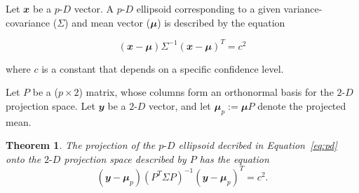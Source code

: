 \documentclass[
  12pt,
]{interact}
\newcommand\pD{$p\text{-}D$}
\newcommand\gD{$2\text{-}D$}
\newtheorem*{theorem}{Theorem}
\begin{document}
Let \(\mathbfit{x}\) be a \pD{} vector. A \pD{} ellipsoid corresponding
to a given variance-covariance (\(\Sigma\)) and mean vector
(\(\mathbfit{\mu}\)) is described by the equation

\begin{equation}
(\mathbfit{x}-\mathbfit{\mu}) \Sigma^{-1}(\mathbfit{x}-\mathbfit{\mu})^T = c^2
\label{eq:pd}
\end{equation}

where \(c\) is a constant that depends on a specific confidence level.

Let \(P\) be a (\(p\times 2\)) matrix, whose columns form an orthonormal
basis for the \gD{} projection space. Let \(\mathbfit{y}\) be a \gD{}
vector, and let \(\mathbfit{\mu}_p := \mathbfit{\mu} P\) denote the
projected mean.

\begin{theorem}
  The projection of the \pD{} ellipsoid decribed in Equation~\ref{eq:pd} onto the \gD{} projection space described by $P$ has the equation
\begin{equation}
(\mathbfit{y} - \mathbfit{\mu}_p)(P^T \Sigma P)^{-1}(\mathbfit{y} - \mathbfit{\mu}_p)^T = c^2.
\end{equation}
\end{theorem}
\end{document}
